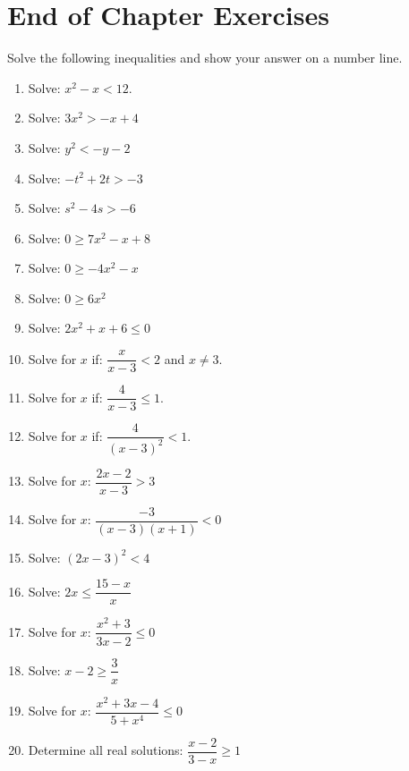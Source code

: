 \section{End of Chapter Exercises}
Solve the following inequalities and show your answer on a number line.
\begin{enumerate}
\item{Solve: $x^2-x<12$.}
\item{Solve: $3x^2 > -x + 4$}
\item{Solve: $y^2 < -y - 2$}
\item{Solve: $-t^2 + 2t > -3$}
\item{Solve: $s^2 - 4s > -6$}
\item{Solve: $0\geq7x^2-x+8$}
\item{Solve: $0\geq -4x^2-x$}
\item{Solve: $0\geq6x^2$}
\item{Solve: $2x^2 + x + 6\leq0$}
\item{Solve for $x$ if: $\dfrac{x}{x-3} < 2$ and $x \neq 3$.}
\item{Solve for $x$ if: $\dfrac{4}{x-3} \leq 1$.}
\item{Solve for $x$ if: $\dfrac{4}{(x-3)^2} < 1$.}
\item{Solve for $x$: $\dfrac{2x-2}{x-3} > 3$}
\item{Solve for $x$: $\dfrac{-3}{(x-3)(x+1)} <0$}
\item{Solve: $(2x-3)^2 < 4$}
\item{Solve: $2x \leq \dfrac{15-x}{x}$}
\item{Solve for $x$: \quad $\dfrac{x^2 + 3}{3x - 2} \leq 0$}
\item{Solve: $x-2 \geq \dfrac{3}{x}$}
\item{Solve for $x$: $\dfrac{x^2+3x-4}{5+x^4} \leq 0$}
\item{Determine all real solutions: $\dfrac{x-2}{3-x} \geq 1$}
\end{enumerate}







